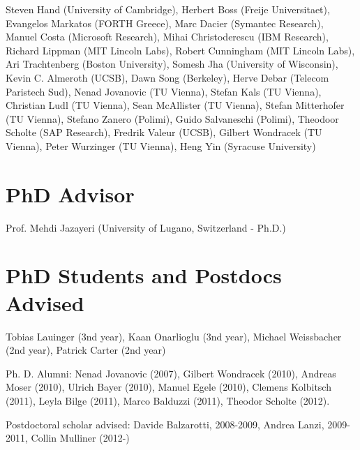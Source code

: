 \documentclass[letterpaper,11pt]{scrartcl}
\begin{document}
Steven Hand (University of Cambridge),
Herbert Boss (Freije Universitaet),
Evangelos Markatos (FORTH Greece),
Marc Dacier (Symantec Research),
Manuel Costa (Microsoft Research),
Mihai Christoderescu (IBM Research),
Richard Lippman (MIT Lincoln Labs),
Robert Cunningham (MIT Lincoln Labs),
Ari Trachtenberg (Boston University),
Somesh Jha (University of Wisconsin),
Kevin C. Almeroth (UCSB),
Dawn Song (Berkeley),
Herve Debar (Telecom Paristech Sud),
Nenad Jovanovic (TU Vienna),
Stefan Kals (TU Vienna),
Christian Ludl  (TU Vienna),
Sean McAllister (TU Vienna),
Stefan Mitterhofer (TU Vienna),
Stefano Zanero (Polimi),
Guido Salvaneschi (Polimi),
Theodoor Scholte (SAP Research),
Fredrik Valeur (UCSB),
Gilbert Wondracek (TU Vienna),
Peter Wurzinger (TU Vienna),
Heng Yin (Syracuse University)

\section*{PhD Advisor}
Prof. Mehdi Jazayeri (University of Lugano, Switzerland - Ph.D.)

\section*{PhD Students and Postdocs Advised}

\noindent Tobias Lauinger (3nd year), Kaan Onarlioglu (3nd
year), Michael Weissbacher (2nd year), Patrick Carter (2nd year)

\noindent Ph. D. Alumni: Nenad Jovanovic (2007), Gilbert Wondracek
(2010), Andreas Moser (2010), Ulrich Bayer (2010), Manuel Egele
(2010), Clemens Kolbitsch (2011), Leyla Bilge (2011), Marco Balduzzi
(2011), Theodor Scholte (2012).

\noindent Postdoctoral scholar advised: Davide Balzarotti, 2008-2009,
Andrea Lanzi, 2009-2011, Collin Mulliner (2012-)
\end{document}
